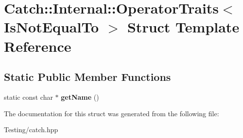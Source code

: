 \hypertarget{struct_catch_1_1_internal_1_1_operator_traits_3_01_is_not_equal_to_01_4}{\section{Catch\-:\-:Internal\-:\-:Operator\-Traits$<$ Is\-Not\-Equal\-To $>$ Struct Template Reference}
\label{struct_catch_1_1_internal_1_1_operator_traits_3_01_is_not_equal_to_01_4}
}
\subsection*{Static Public Member Functions}
\begin{DoxyCompactItemize}
\item 
\hypertarget{struct_catch_1_1_internal_1_1_operator_traits_3_01_is_not_equal_to_01_4_a54a795b8bf7c80a9fdbc7b81f39133b4}{static const char $\ast$ {\bfseries get\-Name} ()}\label{struct_catch_1_1_internal_1_1_operator_traits_3_01_is_not_equal_to_01_4_a54a795b8bf7c80a9fdbc7b81f39133b4}

\end{DoxyCompactItemize}


The documentation for this struct was generated from the following file\-:\begin{DoxyCompactItemize}
\item 
Testing/catch.\-hpp\end{DoxyCompactItemize}
